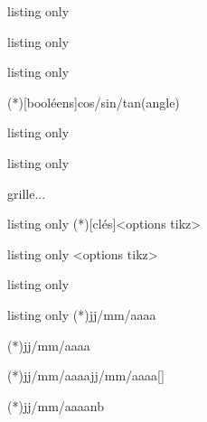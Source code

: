 \begin{PresCodeTexPL}{listing only}
\pflecritens
\end{PresCodeTexPL}

\begin{PresCodeTexPL}{listing only}
\pflecrittrinom
\end{PresCodeTexPL}

\begin{PresCodeTexPL}{listing only}
\pflmesppale

\LigneTrigo(*)[booléens]{cos/sin/tan}(angle)
\pfllignetrig
\end{PresCodeTexPL}

\begin{PresCodeTexPL}{listing only}
\end{PresCodeTexPL}

\begin{PresCodeTexPL}{listing only}
\pflsudomaths

\begin{EnvSudoMaths}[options]{grille}...\end{EnvSudoMaths}
\end{PresCodeTexPL}

\begin{PresCodeTexPL}{listing only}
\FractaleTikz(*)[clés]<options tikz>
\pflfractaltikz

\end{PresCodeTexPL}

\begin{PresCodeTexPL}{listing only}
<options tikz>
\pflchateaucartes
\end{PresCodeTexPL}

\begin{PresCodeTexPL}{listing only}
\pflallumettes
\end{PresCodeTexPL}

\begin{PresCodeTexPL}{listing only}
\JourSelonDate(*){jj/mm/aaaa}
\pfljourselondate

\DateComplete(*){jj/mm/aaaa}
\pfldatecomplet

\NbJoursEntreDates(*){jj/mm/aaaa}{jj/mm/aaaa}[\macro]
\pflnbjoursdates

\AjoutJoursDate(*){jj/mm/aaaa}{nb}
\pflajoutjoursdate
\end{PresCodeTexPL}

